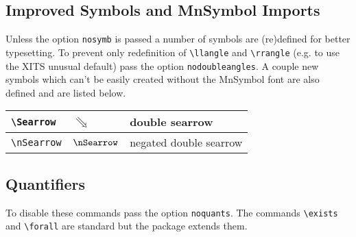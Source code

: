 \documentclass[leqno,11pt]{amsart}
\newcommand{\tab}{\hspace{1cm}}
\begin{document}
\subsection{Improved Symbols and MnSymbol Imports}
Unless the option \verb=nosymb= is passed a number of symbols are (re)defined for better typesetting.  To prevent only redefinition of \verb=\llangle= and \verb=\rrangle= (e.g. to use the XITS unusual default) pass the option \verb=nodoubleangles=.  A couple new symbols which can't be easily created without the MnSymbol font are also defined and are listed below.

\begin{tabular}{l |  l | l}\toprule
	\verb=\Searrow= & \( \Searrow \) & double searrow \\ \midrule
	\verb=\nSearrow= & \( \nSearrow \) & negated double searrow \\   
	\bottomrule
\end{tabular}



\subsection{Quantifiers}
To disable these commands pass the option \verb=noquants=. The commands \verb=\exists= and \verb=\forall= are standard but the package extends them.\\
\end{document}
